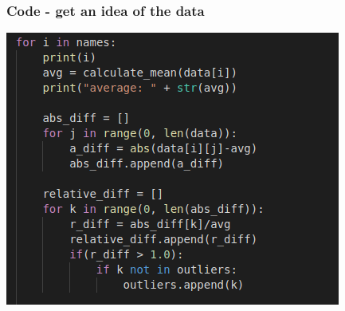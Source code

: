 \documentclass{beamer}
\begin{document}
\begin{frame}
\frametitle{Code - get an idea of the data}
\includegraphics[scale=0.65]
       {code2.png}
\end{frame}
\end{document}
